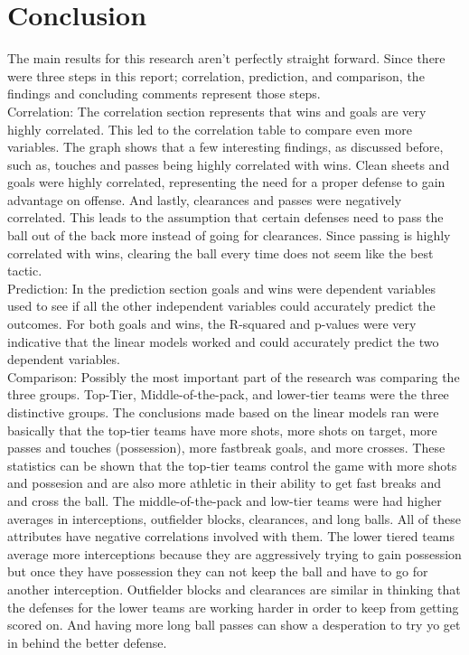 \documentclass[12pt,english]{article}
\begin{document}
\section{Conclusion}\label{sec:Conclusion}
The main results for this research aren't perfectly straight forward. Since there were three steps in this report; correlation, prediction, and comparison, the findings and concluding comments represent those steps. \\
\indent Correlation: The correlation section represents that wins and goals are very highly correlated. This led to the correlation table to compare even more variables. The graph shows that a few interesting findings, as discussed before, such as, touches and passes being highly correlated with wins. Clean sheets and goals were highly correlated, representing the need for a proper defense to gain advantage on offense. And lastly, clearances and passes were negatively correlated. This leads to the assumption that certain defenses need to pass the ball out of the back more instead of going for clearances. Since passing is highly correlated with wins, clearing the ball every time does not seem like the best tactic.  \\
\indent Prediction: In the prediction section goals and wins were dependent variables used to see if all the other independent variables could accurately predict the outcomes. For both goals and wins, the R-squared and p-values were very indicative that the linear models worked and could accurately predict the two dependent variables. \\
\indent Comparison: Possibly the most important part of the research was comparing the three groups. Top-Tier, Middle-of-the-pack, and lower-tier teams were the three distinctive groups. The conclusions made based on the linear models ran were basically that the top-tier teams have more shots, more shots on target, more passes and touches (possession), more fastbreak goals, and more crosses. These statistics can be shown that the top-tier teams control the game with more shots and possesion and are also more athletic in their ability to get fast breaks and and cross the ball. The middle-of-the-pack and low-tier teams were had higher averages in interceptions, outfielder blocks, clearances, and long balls. All of these attributes have negative correlations involved with them. The lower tiered teams average more interceptions because they are aggressively trying to gain possession but once they have possession they can not keep the ball and have to go for another interception. Outfielder blocks and clearances are similar in thinking that the defenses for the lower teams are working harder in order to keep from getting scored on. And having more long ball passes can show a desperation to try yo get in behind the better defense. \\
\end{document}
